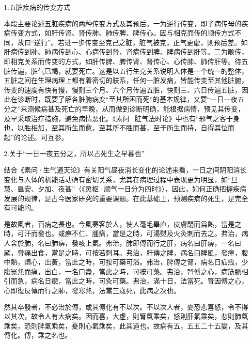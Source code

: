 \documentclass[draft,12pt]{ctexbook}
\begin{document}

1.五脏疾病的传变方式

本段主要论述五脏疾病的两种传变方式及其预后。一为逆行传变，即子病传母的疾病传变方式，如肝传肾、肾传肺、肺传脾、脾传心。因与相克而传的顺传方式不同，故曰“逆行”。若进一步传变至克己之脏，脏气被克，正气更虚，则预后差。如肝病传到肺、肺病传到心、心病传到肾、肾病传到脾、脾病传到肝等。二为顺传，即相克关系而传变的方式，如肝传脾、脾传肾、肾传心、心传肺、肺传肝等。待五脏传遍，脏气已竭，就要死亡。这是以五行生克关系说明人体是一个统一的整体，五脏之间在生理病理上都有着密切的联系，任何一脏发病，皆能传变至其他脏腑，传变的速度有快有慢，慢则三个月、六个月传遍五脏，快则三、六日传遍五脏，因此在诊断时，既要了解各脏腑病变“至其所困而死”的基本规律，又要“一日一夜五分之”来测候病甚及死亡的早晚，从而做到诊断明确，能根据病情，预见其传变，及早采取治疗措施，避免病情恶化。《素问·脏气法时论》中也有“邪气之客于身也，以胜相加，至其所生而愈，至其所不胜而甚，至于所生而持，自得其位而起”的论述。可互参。

2.关于“一日一夜五分之，所以占死生之早暮也”

结合《素问·生气通天论》有关阳气昼夜消长变化的论述来看，一日之间阴阳消长变化与人体的机能活动确有密切关系，尤其在病理过程中表现更为明显，如“旦慧、昼安、夕加、夜甚”（《灵枢·顺气一日分为四时》），因此，如何正确把握疾病发展的规律，是古今医家研究的重要课题。在此基础上，预测疾病的死生，是完全有可能的。


\begin{yuanwen}
是故風者，百病之長也。今風寒客於人，使人毫毛畢直，皮膚閉而爲熱，當是之時，可汗而發也。或痹不仁、腫痛，當是之時，可湯熨及火灸刺而去之。弗治，病人舍於肺，名曰肺痹，發咳上氣。弗治，肺即傳而行之肝，病名曰肝痹，一名曰厥，脅痛出食，當是之時，可按若刺耳。弗治，肝傳之脾，病名曰脾風，發癉，腹中熱，煩心，出黃，當此之時，可按可藥可浴。弗治，脾傳之腎，病名日疝瘕，少腹冤熱而痛，出白，一名曰蠱，當此之時，可按可藥。弗治，腎傅之心，病筋脈相引而急，病名日瘛，當此之時，可灸可藥。弗治，滿十日，法當死。腎因傅之心，心即復反傳而行之肺，發寒熱，法當三歲死，此病之次也。

然其卒發者，不必治於傳，或其傅化有不以次。不以次人者，憂恐悲喜怒，令不得以其次，故令人有大病矣。因而喜，大虛，則腎氣乘矣，怒則肝氣乘矣，悲則肺氣乘矣，恐則脾氣乘矣，憂則心氣乘矣，此其道也。故病有五，五五二十五變，及其傳化。傳，乘之名也。
\end{yuanwen}
\end{document}
